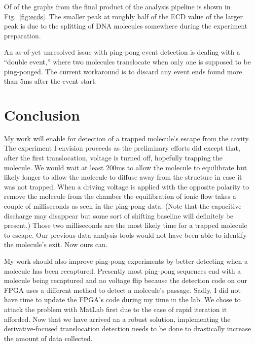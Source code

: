 \documentclass[aps,prl,preprint,groupedaddress]{revtex4}
\begin{document}
Of of the graphs from the final product of the analysis pipeline is shown in Fig.~\ref{fig:ecds}. The smaller peak at roughly half of the ECD value of the larger peak is due to the splitting of DNA molecules somewhere during the experiment preparation.

An as-of-yet unresolved issue with ping-pong event detection is dealing with a ``double event,'' where two molecules translocate when only one is supposed to be ping-ponged.
The current workaround is to discard any event ends found more than 5ms after the event start.


\section{Conclusion}

My work will enable for detection of a trapped molecule's escape from the cavity.
The experiment I envision proceeds as the preliminary efforts did except that, after the first translocation, voltage is turned off, hopefully trapping the molecule.
We would wait at least 200ms to allow the molecule to equilibrate but likely longer to allow the molecule to diffuse away from the structure in case it was not trapped.
When a driving voltage is applied with the opposite polarity to remove the molecule from the chamber the equilibration of ionic flow takes a couple of milliseconds as seen in the ping-pong data.
(Note that the capacitive discharge may disappear but some sort of shifting baseline will definitely be present.)
Those two milliseconds are the most likely time for a trapped molecule to escape.
Our previous data analysis tools would not have been able to identify the molecule's exit.
Now ours can.

My work should also improve ping-pong experiments by better detecting when a molecule has been recaptured.
Presently most ping-pong sequences end with a molecule being recaptured and no voltage flip because the detection code on our FPGA uses a different method to detect a molecule's passage.
Sadly, I did not have time to update the FPGA's code during my time in the lab.
We chose to attack the problem with MatLab first due to the ease of rapid iteration it afforded.
Now that we have arrived an a robust solution, implementing the derivative-focused translocation detection needs to be done to drastically increase the amount of data collected.
\end{document}
